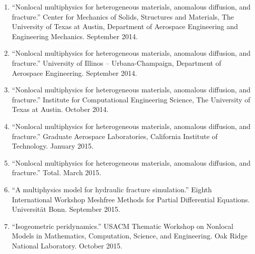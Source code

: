 \begin{enumerate}[resume]
    \item ``Nonlocal multiphysics for heterogeneous materials, anomalous diffusion, and fracture.'' Center for Mechanics of Solids, Structures and Materials, The University of Texas at Austin, Department of Aerospace Engineering and Engineering Mechanics. September 2014.
    \item ``Nonlocal multiphysics for heterogeneous materials, anomalous diffusion, and fracture.'' University of Illinos -- Urbana-Champaign, Department of Aerospace Engineering. September 2014.
    \item ``Nonlocal multiphysics for heterogeneous materials, anomalous diffusion, and fracture.'' Institute for Computational Engineering Science, The University of Texas at Austin. October 2014.
    \item ``Nonlocal multiphysics for heterogeneous materials, anomalous diffusion, and fracture.'' Graduate Aerospace Laboratories, California Institute of Technology. January 2015.
    \item ``Nonlocal multiphysics for heterogeneous materials, anomalous diffusion, and fracture.'' Total. March 2015.
    \item ``A multiphysics model for hydraulic fracture simulation.''  Eighth International Workshop Meshfree Methods for Partial Differential Equations. Universit\"{a}t Bonn. September 2015.
    \item ``Isogeometric peridynamics.'' USACM Thematic Workshop on Nonlocal Models in Mathematics, Computation, Science, and Engineering.  Oak Ridge National Laboratory. October 2015.
\end{enumerate}
\else
%
\ifdefined\ispdf
